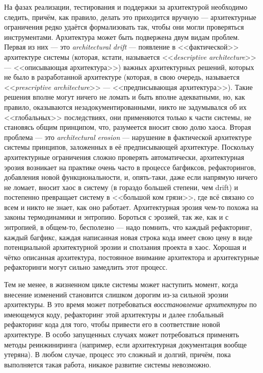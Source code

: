 \documentclass{../../text-style}
\begin{document}
На фазах реализации, тестирования и поддержки за архитектурой необходимо следить, причём, как правило, делать это приходится вручную --- архитектурные ограничения редко удаётся формализовать так, чтобы они могли проверяться инструментами. Архитектура может быть подвержена двум видам проблем. Первая из них --- это \emph{architectural drift} --- появление в <<фактической>> архитектуре системы (которая, кстати, называется <<\emph{descriptive architecture}>> --- <<описывающая архитектура>>) важных архитектурных решений, которых не было в разработанной архитектуре (которая, в свою очередь, называется <<\emph{prescriptive architecture}>> --- <<предписывающая архитектура>>). Такие решения вполне могут ничего не ломать и быть вполне адекватными, но, как правило, оказываются незадокументированными, никто не задумывался об их <<глобальных>> последствиях, они применяются только к части системы, не становясь общим принципом, что, разумеется вносит свою долю хаоса. Вторая проблема --- это \emph{architectural erosion} --- нарушение в фактической архитектуре системы принципов, заложенных в её предписывающей архитектуре. Поскольку архитектурные ограничения сложно проверять автоматически, архитектурная эрозия возникает на практике очень часто в процессе багфиксов, рефакторингов, добавления новой функциональности, и, опять-таки, даже если напрямую ничего не ломает, вносит хаос в систему (в гораздо большей степени, чем drift) и постепенно превращает систему в <<большой ком грязи>>, где всё связано со всем и никто не знает, как оно работает. Архитектурная эрозия чем-то похожа на законы термодинамики и энтропию. Бороться с эрозией, так же, как и с энтропией, в общем-то, бесполезно --- надо помнить, что каждый рефакторинг, каждый багфикс, каждая написанная новая строка кода имеет свою цену в виде потенциальной архитектурной эрозии и сползания проекта в хаос. Хорошая и чётко описанная архитектура, постоянное внимание архитектора и архитектурные рефакторинги могут сильно замедлить этот процесс.

Тем не менее, в жизненном цикле системы может наступить момент, когда внесение изменений становится слишком дорогим из-за сильной эрозии архитектуры. В это время может потребоваться \emph{восстановление архитектуры} по имеющемуся коду, рефакторинг этой архитектуры и далее глобальный рефакторинг кода для того, чтобы привести его в соответствие новой архитектуре. В особо запущенных случаях может потребоваться применять методы реинжиниринга (например, если архитектурная документация вообще утеряна). В любом случае, процесс это сложный и долгий, причём, пока выполняется такая работа, никакое развитие системы невозможно.
\end{document}
